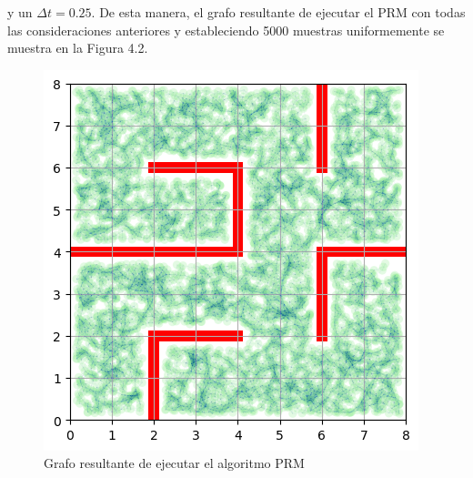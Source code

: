 \documentclass[spanish,mexico]{article}
\numberwithin{equation}{section}
\theoremstyle{definition}
\theoremstyle{remark}
\begin{document}
y un $\Delta t = 0.25$. De esta manera, el grafo resultante de ejecutar el PRM con todas las consideraciones anteriores y estableciendo 5000 muestras uniformemente se muestra en la Figura 4.2.
\begin{figure}[hbtp]
\centering
\includegraphics[scale=0.6]{img/PRMgraph.png}
\caption{Grafo resultante de ejecutar el algoritmo PRM}
\end{figure}
\newpage
\end{document}
